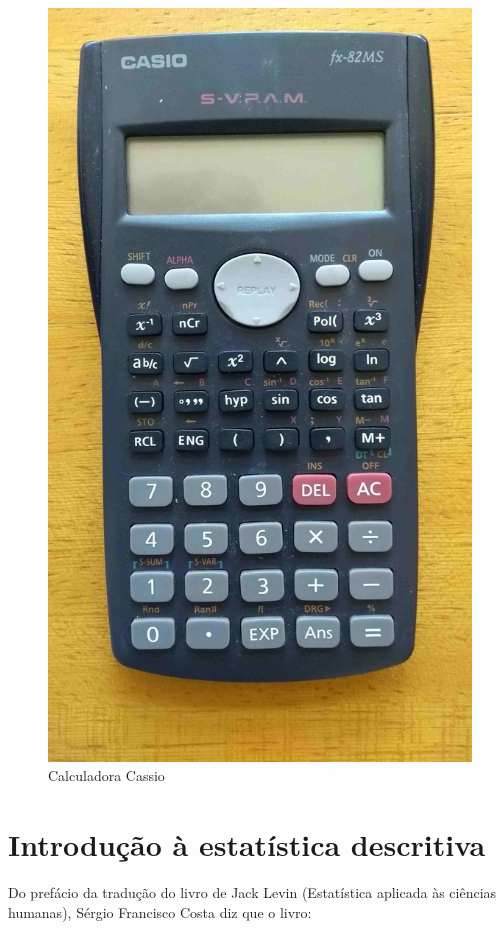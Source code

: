 \documentclass[
]{book}
\begin{document}
\begin{figure}

{\centering \includegraphics[width=0.8\linewidth]{images2/calculadora_cassio} 

}

\caption{Calculadora Cassio}\label{fig:unnamed-chunk-10}
\end{figure}

\hypertarget{introduuxe7uxe3o-uxe0-estatuxedstica-descritiva}{%
\chapter{Introdução à estatística descritiva}\label{introduuxe7uxe3o-uxe0-estatuxedstica-descritiva}}

\hfill\break

Do prefácio da tradução do livro de Jack Levin (Estatística aplicada às ciências humanas), Sérgio Francisco Costa diz que o livro:
\end{document}
